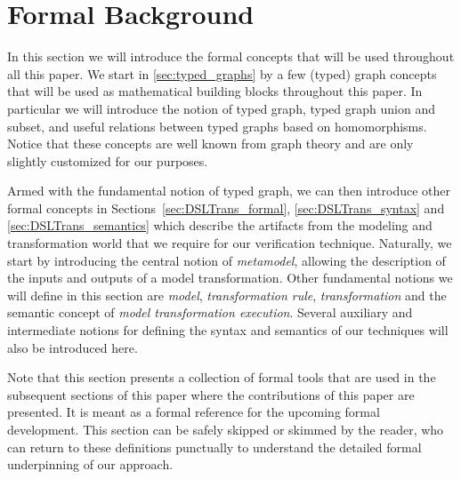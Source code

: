 \section{Formal Background}
\label{sec:formal_background}

In this section we will introduce the formal concepts that will be used throughout all this paper. We start in \cref{sec:typed_graphs} by a few (typed) graph concepts that will be used as mathematical building blocks throughout this paper. In particular we will introduce the notion of typed graph, typed graph union and subset, and useful relations between typed graphs based on homomorphisms. Notice that these concepts are well known from graph theory and are only slightly customized for our purposes.

Armed with the fundamental notion of typed graph, we can then introduce other formal concepts in Sections~\ref{sec:DSLTrans_formal}, \ref{sec:DSLTrans_syntax} and \ref{sec:DSLTrans_semantics} which describe the artifacts from the modeling and transformation world that we require for our verification technique. Naturally, we start by introducing the central notion of \emph{metamodel}, allowing the description of the inputs and outputs of a model transformation. Other fundamental notions we will define in this section are \emph{model}, \emph{transformation rule}, \emph{transformation} and the semantic concept of \emph{model transformation execution}. Several auxiliary and intermediate notions for defining the syntax and semantics of our techniques will also be introduced here. 

Note that this section presents a collection of formal tools that are used in the subsequent sections of this paper where the contributions of this paper are presented. It is meant as a formal reference for the upcoming formal development. This section can be safely skipped or skimmed by the reader, who can return to these definitions punctually to understand the detailed formal underpinning of our approach. 

